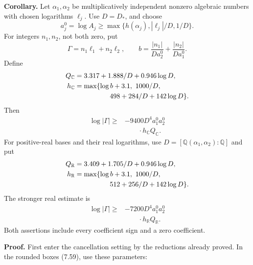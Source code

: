\documentclass[
  11pt,
  a4paper,
]{article}
\begin{document}
\textbf{Corollary.} Let \(\alpha_1,\alpha_2\) be multiplicatively
independent nonzero algebraic numbers with chosen logarithms \(\ell_j\).
Use \(D=D_*\), and choose \[
a_j^0=\log A_j\ge\max\{h(\alpha_j),|\ell_j|/D,1/D\}.
\] For integers \(n_1,n_2\), not both zero, put \[
\Gamma=n_1\ell_1+n_2\ell_2,\qquad
b=\frac{|n_1|}{Da_2^0}+\frac{|n_2|}{Da_1^0}.
\] Define \[
\begin{aligned}
Q_{\mathbb{C}}&=3.317+1.888/D+0.946\log D,\\
h_{\mathbb{C}}&=\max\{\log b+3.1,\ 1000/D,\\
&\hspace{18mm}498+284/D+142\log D\}.
\end{aligned}
\] Then \[
\begin{aligned}
\log|\Gamma|\ge{}&-9400D^4a_1^0a_2^0\\
&\qquad\cdot h_{\mathbb{C}}Q_{\mathbb{C}}.
\end{aligned} \tag{7.72}
\] For positive-real bases and their real logarithms, use
\(D=[\mathbb Q(\alpha_1,\alpha_2):\mathbb Q]\) and put \[
\begin{aligned}
Q_{\mathbb{R}}&=3.409+1.705/D+0.946\log D,\\
h_{\mathbb{R}}&=\max\{\log b+3.1,\ 1000/D,\\
&\hspace{18mm}512+256/D+142\log D\}.
\end{aligned}
\] The stronger real estimate is \[
\begin{aligned}
\log|\Gamma|\ge{}&-7200D^4a_1^0a_2^0\\
&\qquad\cdot h_{\mathbb{R}}Q_{\mathbb{R}}.
\end{aligned} \tag{7.73}
\] Both assertions include every coefficient sign and a zero
coefficient.

\textbf{Proof.} First enter the cancellation setting by the reductions
already proved. In the rounded boxes (7.59), use these parameters:
\end{document}
